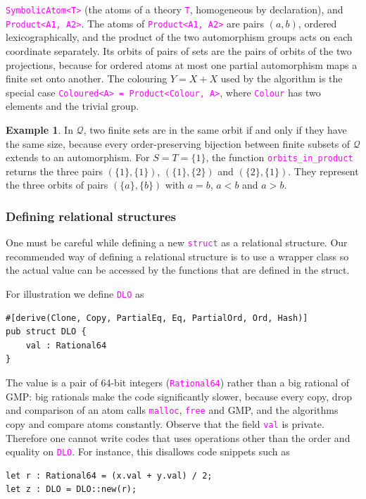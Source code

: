 \documentclass[12pt,a4paper,article]{memoir}
\newcommand{\dloQ}{\mathcal{Q}}
\newcommand{\arka}[1]{}
\newcommand{\code}[1]{\texttt{\textcolor{magenta}{#1}}}
\theoremstyle{definition}
\newtheorem{example}[theorem]{Example}
\begin{document}
\code{SymbolicAtom<T>} (the atoms of a theory \code{T}, homogeneous by declaration),
and \code{Product<A1, A2>}.
The atoms of \code{Product<A1, A2>} are pairs $(a, b)$, ordered lexicographically,
and the product of the two automorphism groups acts on each coordinate separately.
Its orbits of pairs of sets are the pairs of orbits of the two projections,
because for ordered atoms at most one partial automorphism maps a finite set onto another.
The colouring $Y = X + X$ used by the algorithm is the special case
\code{Coloured<A> = Product<Colour, A>}, where \code{Colour} has two elements and the trivial group.
%
\begin{example}
In $\dloQ$, two finite sets are in the same orbit if and only if they have the same size,
because every order-preserving bijection between finite subsets of $\dloQ$ extends to an automorphism.
For $S = T = \{1\}$, the function \code{orbits\_in\_product} returns the three pairs
$(\{1\},\{1\})$, $(\{1\},\{2\})$ and $(\{2\},\{1\})$.
They represent the three orbits of pairs $(\{a\},\{b\})$ with $a = b$, $a < b$ and $a > b$.
\end{example}
%
\subsubsection{Defining relational structures}
%
One must be careful while defining a new \code{struct} as a relational structure.
Our recommended way of defining a relational structure is to use a wrapper class so the actual value can be accessed by the functions that are defined in the struct.

For illustration we define \code{DLO} as
\color{magenta}
\begin{verbatim}
#[derive(Clone, Copy, PartialEq, Eq, PartialOrd, Ord, Hash)]
pub struct DLO {
    val : Rational64
}
\end{verbatim}
\color{black}
%
The value is a pair of 64-bit integers (\code{Rational64}) rather than a big rational of GMP:
big rationals make the code significantly slower,
because every copy, drop and comparison of an atom calls \code{malloc}, \code{free} and GMP,
and the algorithms copy and compare atoms constantly.
%
Observe that the field \code{val} is private.
Therefore one cannot write codes that uses operations other than the order and equality on \code{DLO}.
For instance, this disallows code snippets such as
\color{magenta}
\begin{verbatim}
let r : Rational64 = (x.val + y.val) / 2;
let z : DLO = DLO::new(r);
\end{verbatim}
\color{black}
%
\arka{one can still write a piece of code that runs on a while loop and computes an element greater than a given element}
%
\end{document}
